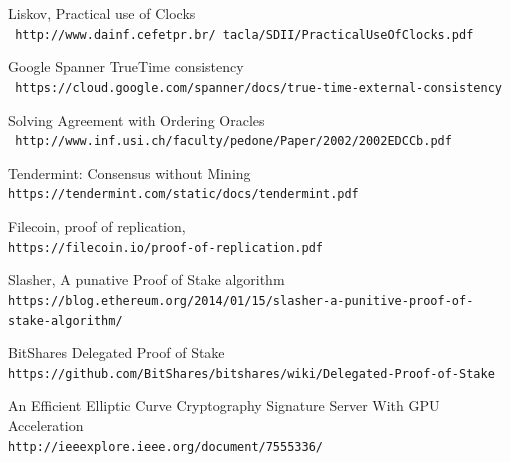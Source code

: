 \documentclass[12pt]{article}
\begin{document}



\begin{thebibliography}{9}
Liskov, Practical use of Clocks
\\\texttt{ http://www.dainf.cefetpr.br/~tacla/SDII/PracticalUseOfClocks.pdf}

Google Spanner TrueTime consistency
\\\texttt{ https://cloud.google.com/spanner/docs/true-time-external-consistency}

Solving Agreement with Ordering Oracles
\\\texttt{ http://www.inf.usi.ch/faculty/pedone/Paper/2002/2002EDCCb.pdf}

Tendermint: Consensus without Mining
\\\texttt{https://tendermint.com/static/docs/tendermint.pdf}

Filecoin, proof of replication,
\\\texttt{https://filecoin.io/proof-of-replication.pdf}

Slasher, A punative Proof of Stake algorithm
\\\texttt{https://blog.ethereum.org/2014/01/15/slasher-a-punitive-proof-of-stake-algorithm/}

BitShares Delegated Proof of Stake
\\\texttt{https://github.com/BitShares/bitshares/wiki/Delegated-Proof-of-Stake}

An Efficient Elliptic Curve Cryptography Signature Server With GPU Acceleration
\\\texttt{http://ieeexplore.ieee.org/document/7555336/}
\end{thebibliography}
\end{document}
